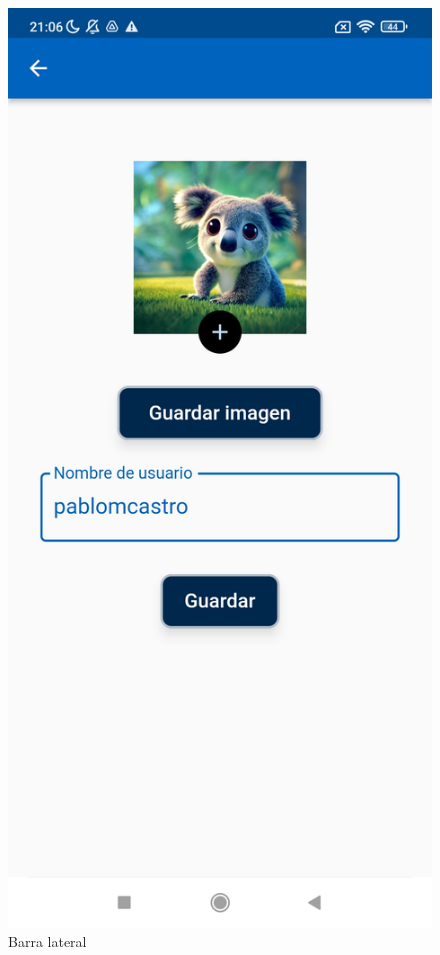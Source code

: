 \documentclass{article}
\begin{document}
\begin{figure}[htbp]
\begin{minipage}[h]{0.32\textwidth}
        \caption{Barra lateral}
    \end{minipage}
    \hfill    
    \begin{minipage}[h]{0.32\textwidth}
        \includegraphics[width=\textwidth]{imagenes/pantallas/editar_perfil.jpg}

\end{minipage}
\end{figure}
\end{document}
